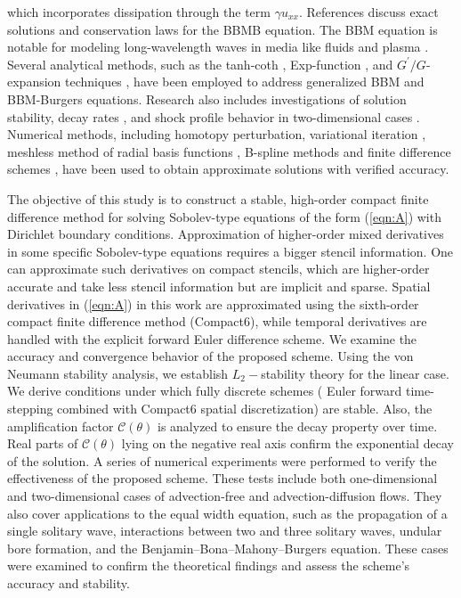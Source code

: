 \documentclass[11pt,a4paper]{amsart}
\theoremstyle{plain}
\theoremstyle{definition}
\theoremstyle{remark}
\numberwithin{equation}{section}
\begin{document}
which incorporates dissipation through the term \( \gamma u_{xx} \). References \cite{bruzon2014weak, bruzon2012conservation, bruzon2016conservation} discuss exact solutions and conservation laws for the BBMB equation. The BBM equation is notable for modeling long-wavelength waves in media like fluids and plasma \cite{abbasbandy2010first}. Several analytical methods, such as the tanh-coth \cite{salas2010new}, Exp-function \cite{ganji2009approximate, noor2011some}, and $ G^{\prime}/G $-expansion techniques \cite{bahrami2011exact}, have been employed to address generalized BBM and BBM-Burgers equations. Research also includes investigations of solution stability, decay rates \cite{qinghua2012degenerate, guo2012optimal, yin2010exponential}, and shock profile behavior in two-dimensional cases \cite{xiao2013nonlinear}. Numerical methods, including homotopy perturbation, variational iteration \cite{tari2007approximate}, meshless method of radial basis functions \cite{dehghan2014numerical}, B-spline methods \cite{kumar2016b, joshi2023numerical, jena2023numerical} and finite difference schemes \cite{achouri2006convergence}, have been used to obtain approximate solutions with verified accuracy.\par

\par The objective of this study is to construct a stable, high-order compact finite difference method for solving Sobolev-type equations of the form (\ref{eqn:A}) with  Dirichlet boundary conditions. Approximation of higher-order mixed derivatives in some specific Sobolev-type equations requires a bigger stencil information.  One can approximate such derivatives on compact stencils, which are higher-order accurate and take less stencil information but are implicit and sparse. Spatial derivatives in (\ref{eqn:A}) in this work are approximated using the sixth-order compact finite difference method (Compact6), while temporal derivatives are handled with the explicit forward Euler difference scheme. We examine the accuracy and convergence behavior of the proposed scheme. Using the von Neumann stability analysis, we establish $L_2-$stability theory for the linear case. We derive conditions under which fully discrete schemes ( Euler forward time-stepping combined with Compact6 spatial discretization) are stable. Also, the amplification factor $\mathcal{C}(\theta)$ is analyzed to ensure the decay property over time. Real parts of $\mathcal{C}(\theta)$ lying on the negative real axis confirm the exponential decay of the solution. A series of numerical experiments were performed to verify the effectiveness of the proposed scheme. These tests include both one-dimensional and two-dimensional cases of advection-free and advection-diffusion flows. They also cover applications to the equal width equation, such as the propagation of a single solitary wave, interactions between two and three solitary waves, undular bore formation, and the Benjamin–Bona–Mahony–Burgers equation. These cases were examined to confirm the theoretical findings and assess the scheme’s accuracy and stability.
\end{document}
